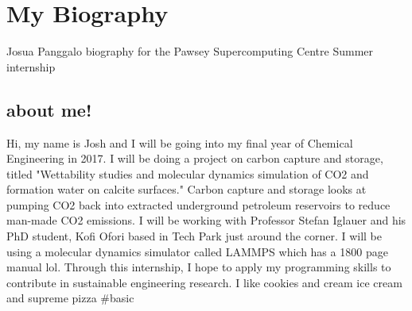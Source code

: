 \section{My Biography}
Josua Panggalo biography for the Pawsey Supercomputing Centre Summer internship
\subsection{about me!}
Hi, my name is Josh and I will be going into my final year of Chemical Engineering in 2017. I will be doing a project on carbon capture and storage, titled "Wettability studies and molecular dynamics simulation of CO2 and formation water on calcite surfaces." Carbon capture and storage looks at pumping CO2 back into extracted underground petroleum reservoirs to reduce man-made CO2 emissions. I will be working with Professor Stefan Iglauer and his PhD student, Kofi Ofori based in Tech Park just around the corner. I will be using a molecular dynamics simulator called LAMMPS which has a 1800 page manual lol. Through this internship, I hope to apply my programming skills to contribute in sustainable engineering research. I like cookies and cream ice cream and supreme pizza \#basic
